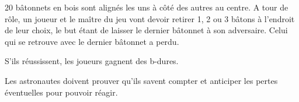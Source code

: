 \documentclass{grand-jeu}
\begin{document}
\begin{liste-materiel}

\end{liste-materiel}

\begin{regles}
20 bâtonnets en bois sont alignés les uns à côté des autres au centre. A tour de rôle, un joueur et le maître du jeu vont devoir retirer 1, 2 ou 3 bâtons à l'endroit de leur choix, le but étant de laisser le dernier bâtonnet à son adversaire. Celui qui se retrouve avec le dernier bâtonnet a perdu.


S’ils réussissent, les joueurs gagnent des b-dures. 
\end{regles}

\begin{imaginaire}
Les astronautes doivent prouver qu'ils savent compter et anticiper les pertes éventuelles pour pouvoir réagir. 
\end{imaginaire}

\begin{moments-stop}
\end{moments-stop}
\end{document}
